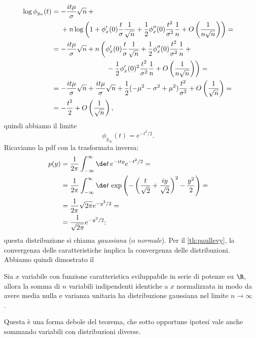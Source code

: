 \begin{align*}
	\log\phi_{y_n}(t)
	&= -\frac{it\mu}{\sigma}\sqrt n + {} \\
	&\phantom{{}={}} + n \log\left(1 + \phi_x'(0) \frac t\sigma \frac1{\sqrt n}
	+ \frac12 \phi_x''(0) \frac{t^2}{\sigma^2} \frac1n
	+ O\left(\frac1{n\sqrt n}\right) \right) = \\
	&= -\frac{it\mu}{\sigma}\sqrt n
	+ n \left( \phi_x'(0) \frac t\sigma \frac1{\sqrt n}
	+ \frac12 \phi_x''(0) \frac{t^2}{\sigma^2} \frac 1n + {}\right. \\
	&\left.\phantom{= -\frac{it\mu}{\sigma}\sqrt n + n\left(\vphantom{\frac1{\sqrt n}}\right.}
	- \frac12 \phi_x'(0)^2 \frac{t^2}{\sigma^2} \frac 1n 
	+ O\left(\frac1{n\sqrt n}\right) \right) = \\
	&= -\frac{it\mu}{\sigma}\sqrt n
	+ \frac{it\mu}{\sigma}\sqrt n
	+ \frac12 (-\mu^2 - \sigma^2 + \mu^2) \frac{t^2}{\sigma^2} + O\left(\frac1{\sqrt n}\right) = \\
	&= -\frac{t^2}2 + O\left(\frac1{\sqrt n}\right),
\end{align*}
quindi abbiamo il limite
\begin{equation*}
	\phi_{y_\infty}(t) = e^{-t^2/2}.
\end{equation*}
Ricaviamo la pdf con la trasformata inversa:
\begin{align*}
	p(y)
	&= \frac1{2\pi} \int_{-\infty}^\infty \de t\, e^{-ity} e^{-t^2/2} = \\
	&= \frac1{2\pi} \int_{-\infty}^\infty \de t\,
	\exp\left( -\left(\frac t{\sqrt 2} + \frac{iy}{\sqrt 2}\right)^2 - \frac{y^2}2 \right) = \\
	&= \frac1{2\pi} \sqrt{2\pi} e^{-y^2/2} = \\
	&= \frac1{\sqrt{2\pi}} e^{-y^2/2};
\end{align*}
questa distribuzione si chiama \emph{gaussiana} (o \emph{normale}).
Per il \autoref{th:paullevy},
la convergenza delle caratteristiche implica la convergenza delle distribuzioni.
Abbiamo quindi dimostrato il
\begin{theorem}
	\label{th:limitecentrale}
	Sia $x$ variabile con funzione caratteristica sviluppabile in serie di potenze su $\R$,
	allora la somma di $n$ variabili indipendenti identiche a $x$ normalizzata in modo da avere media nulla e varianza unitaria ha distribuzione gaussiana nel limite $n\to\infty$.
\end{theorem}
%
Questa è una forma debole del teorema, che sotto opportune ipotesi vale anche
sommando variabili con distribuzioni diverse.

